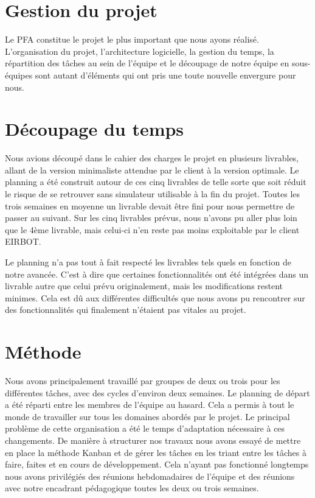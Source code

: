 \section{Gestion du projet}

Le PFA constitue le projet le plus important que nous ayons réalisé. L'organisation du projet, l'architecture logicielle, la gestion du temps, la répartition des tâches au sein de l'équipe et le découpage de notre équipe en sous-équipes sont autant d'éléments qui ont pris une toute nouvelle envergure pour nous.

\section{Découpage du temps}

Nous avions découpé dans le cahier des charges le projet en plusieurs livrables, allant de la version minimaliste attendue par le client à la version optimale. Le planning a été construit autour de ces cinq livrables de telle sorte que soit réduit le risque de se retrouver sans simulateur utilisable à la fin du projet. Toutes les trois semaines en moyenne un livrable devait être fini pour nous permettre de passer au suivant.
Sur les cinq livrables prévus, nous n'avons pu aller plus loin que le 4ème livrable, mais celui-ci n'en reste pas moins exploitable par le client EIRBOT.

Le planning n'a pas tout à fait respecté les livrables tels quels en fonction de notre avancée. C'est à dire que certaines fonctionnalités ont été intégrées dans un livrable autre que celui prévu originalement, mais les modifications restent minimes. Cela est dû aux différentes difficultés que nous avons pu rencontrer sur des fonctionnalités qui finalement n'étaient pas vitales au projet.

\section{Méthode}

Nous avons principalement travaillé par groupes de deux ou trois pour les différentes tâches, avec des cycles d'environ deux semaines. Le planning de départ a été réparti entre les membres de l'équipe au hasard. Cela a permis à tout le monde de travailler sur tous les domaines abordés par le projet. Le principal problème de cette organisation a été le temps d'adaptation nécessaire à ces changements. De manière à structurer nos travaux nous avons essayé de mettre en place la méthode Kanban et de gérer les tâches en les triant entre les tâches à faire, faites et en cours de développement. Cela n'ayant pas fonctionné longtemps nous avons privilégiés des réunions hebdomadaires de l'équipe et des réunions avec notre encadrant pédagogique toutes les deux ou trois semaines.

